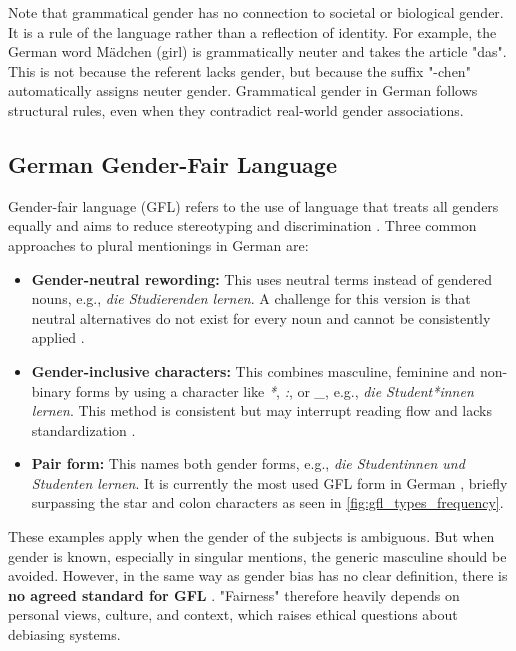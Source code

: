     Note that grammatical gender has no connection to societal or biological gender. It is a rule of the language rather than a reflection of identity. For example, the German word Mädchen (girl) is grammatically neuter and takes the article "das". This is not because the referent lacks gender, but because the suffix "-chen" automatically assigns neuter gender. Grammatical gender in German follows structural rules, even when they contradict real-world gender associations.

\subsection{German Gender-Fair Language} \label{subsection:german_gfl}
Gender-fair language (GFL) refers to the use of language that treats all genders equally and aims to reduce stereotyping and discrimination \citep{sczesnyCanGenderFairLanguage2016}. Three common approaches to plural mentionings in German are: 

\begin{itemize}
    \item \textbf{Gender-neutral rewording:}  
    This uses neutral terms instead of gendered nouns, e.g., \textit{die Studierenden lernen}. A challenge for this version is that neutral alternatives do not exist for every noun and cannot be consistently applied \citep{lardelliBuildingBridgesDataset2024}.

    \item \textbf{Gender-inclusive characters:}  
    This combines masculine, feminine and non-binary forms by using a character like \textit{*}, \textit{:}, or \textit{\_}, e.g., \textit{die Student*innen lernen}. This method is consistent but may interrupt reading flow and lacks standardization \citep{lardelliBuildingBridgesDataset2024}.

    \item \textbf{Pair form:}  
    This names both gender forms, e.g., \textit{die Studentinnen und Studenten lernen}. It is currently the most used GFL form in German \citep{waldendorfWordsChangeIncrease2024}, briefly surpassing the star and colon characters as seen in \autoref{fig:gfl_types_frequency}.
\end{itemize}

These examples apply when the gender of the subjects is ambiguous. But when gender is known, especially in singular mentions, the generic masculine should be avoided. However, in the same way as gender bias has no clear definition, there is \textbf{no agreed standard for GFL} \citep{lardelliBuildingBridgesDataset2024, savoldiDecadeGenderBias2025}. "Fairness" therefore heavily depends on personal views, culture, and context, which raises ethical questions about debiasing systems.

